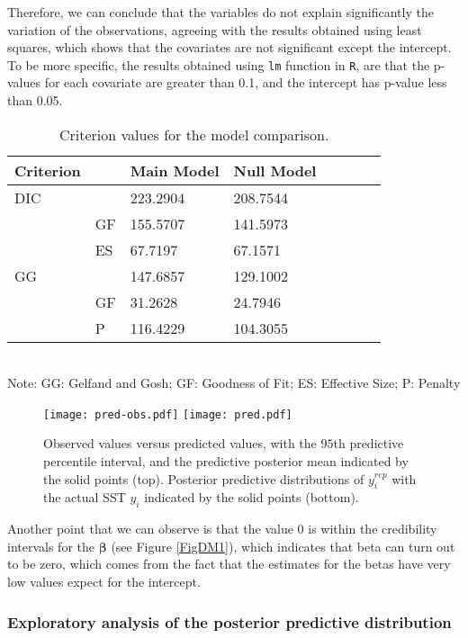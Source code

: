 \documentclass{asaproc}
\begin{document}
Therefore, we can conclude that the variables do not explain significantly the variation of the observations, agreeing with the results obtained using least squares, which shows that the covariates are not significant except the intercept. To be more specific, the results obtained using \texttt{lm} function in \texttt{R}, are that the p-values for each covariate are greater than 0.1, and the intercept has p-value less than 0.05.
\begin{table}[H]
\caption{Criterion values for the model comparison.}\label{criter}
\centering
\begin{tabular}{llllllcc}
\hline
Criterion & & Main Model & Null Model \\
\hline

DIC & & 223.2904 & 208.7544  \\
& GF & 155.5707 & 141.5973 \\
& ES  & 67.7197 & 67.1571 \\

GG & & 147.6857 & 129.1002 \\
& GF & 31.2628 & 24.7946  \\
& P  & 116.4229 & 104.3055 \\

\hline
\end{tabular} \\
Note: GG: Gelfand and Gosh; GF: Goodness of Fit; ES: Effective Size; P: Penalty
\end{table}

\begin{figure}[H]
\centering
\texttt{[image: pred-obs.pdf]}  
\texttt{[image: pred.pdf]}  
\caption{Observed values versus predicted values, with the $95$th predictive percentile interval, and the predictive posterior mean indicated by the solid points (top). Posterior predictive distributions of $y_i^{rep}$ with the actual SST $y_i$ indicated by the solid points (bottom).}
\label{Pred}
\end{figure}


Another point that we can observe is that the value 0 is within the credibility intervals for the $\boldsymbol{\beta}$ (see Figure \ref{FigDM1}), which indicates that beta can turn out to be zero, which comes from the fact that the estimates for the betas have very low values expect for the intercept.

\subsubsection{Exploratory analysis of the posterior predictive distribution}
\end{document}
